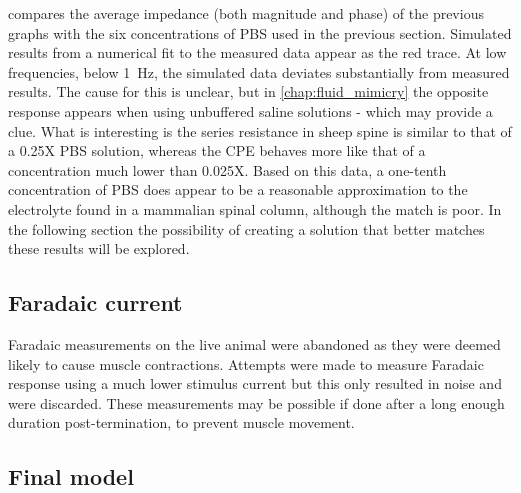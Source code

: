      compares the average impedance (both magnitude and phase) of the previous graphs with the six concentrations of PBS used in the previous section.
    Simulated results from a numerical fit to the measured data appear as the red trace.
    At low frequencies, below \SI{1}{\hertz}, the simulated data deviates substantially from measured results.
    The cause for this is unclear, but in \cref{chap:fluid_mimicry} the opposite response appears when using unbuffered saline solutions - which may provide a clue.
    What is interesting is the series resistance in sheep spine is similar to that of a 0.25X PBS solution, whereas the CPE behaves more like that of a concentration much lower than 0.025X.
    Based on this data, a one-tenth concentration of PBS does appear to be a reasonable approximation to the electrolyte found in a mammalian spinal column, although the match is poor.
    In the following section the possibility of creating a solution that better matches these results will be explored.
 

  \subsection{Faradaic current}
  
    Faradaic measurements on the live animal were abandoned as they were deemed likely to cause muscle contractions.
    Attempts were made to measure Faradaic response using a much lower stimulus current but this only resulted in noise and were discarded.
    These measurements may be possible if done after a long enough duration post-termination, to prevent muscle movement.
  
  \subsection{Final model}

